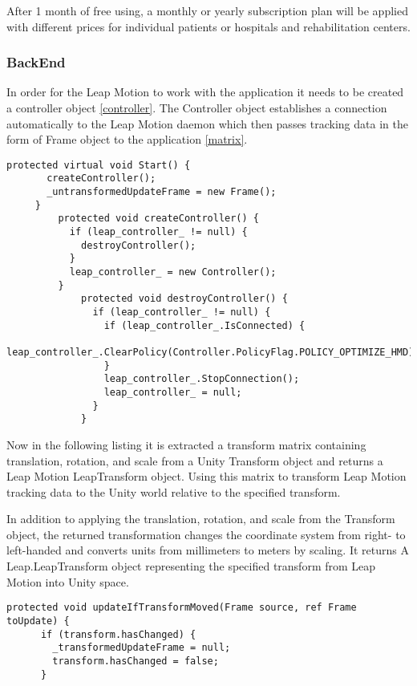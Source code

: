 {After 1 month of free using, a monthly or yearly subscription plan will be applied with different prices for individual patients or hospitals and rehabilitation centers.


\subsubsection{BackEnd}

In order for the Leap Motion to work with the application it needs to be created a controller object \autoref{controller}. The Controller object establishes a connection automatically to the Leap Motion daemon which then passes tracking data in the form of Frame object to the application \autoref{matrix}.

\begin{lstlisting}[caption={Controller connection and frame setting},label={conroller}]
 protected virtual void Start() {
       createController();
       _untransformedUpdateFrame = new Frame();
     }
         protected void createController() {
           if (leap_controller_ != null) {
             destroyController();
           }
           leap_controller_ = new Controller();
         }
             protected void destroyController() {
               if (leap_controller_ != null) {
                 if (leap_controller_.IsConnected) {
                   leap_controller_.ClearPolicy(Controller.PolicyFlag.POLICY_OPTIMIZE_HMD);
                 }
                 leap_controller_.StopConnection();
                 leap_controller_ = null;
               }
             }
\end{lstlisting}



Now in the following listing it is extracted a transform matrix containing translation, rotation, and scale from a Unity Transform object and returns a Leap Motion LeapTransform object.
Using this matrix to transform Leap Motion tracking data to the Unity world relative to the
specified transform.

In addition to applying the translation, rotation, and scale from the Transform object, the returned
 transformation changes the coordinate system from right- to left-handed and converts units from millimeters to meters
by scaling.
It returns A Leap.LeapTransform object representing the specified transform from Leap Motion into Unity space.
\begin{lstlisting}[caption={Leap Motion tracking matrix data.},label={matrix}]
protected void updateIfTransformMoved(Frame source, ref Frame toUpdate) {
      if (transform.hasChanged) {
        _transformedUpdateFrame = null;
        transform.hasChanged = false;
      }


\end{lstlisting}}
